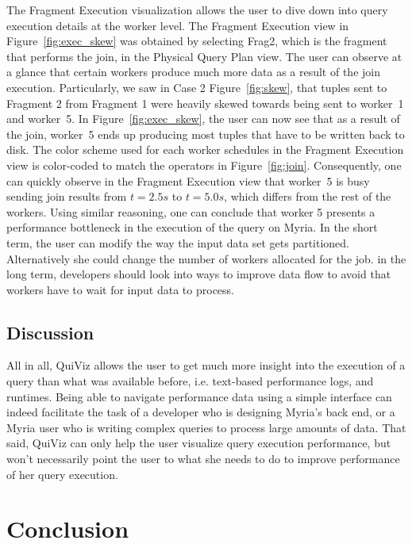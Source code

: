 \documentclass{chi2009}
\newcommand*{\system}{QuiViz\xspace}
\newcommand*{\graph}{Physical Query Plan\xspace}
\newcommand*{\fragment}{Fragment Execution\xspace}
\begin{document}
The \fragment visualization allows the user to dive down into query execution details at the worker level. The \fragment view in Figure~\ref{fig:exec_skew} was obtained by selecting Frag2, which is the fragment that performs the join, in the \graph view. The user can observe at a glance that certain workers produce much more data as a result of the join execution. Particularly, we saw in Case 2 Figure~\ref{fig:skew}, that tuples sent to Fragment 2 from Fragment 1 were heavily skewed towards being sent to worker~1 and worker~5. In Figure~\ref{fig:exec_skew}, the user can now see that as a result of the join, worker~5 ends up producing most tuples that have to be written back to disk. The color scheme used for each worker schedules in the \fragment view is color-coded to match the operators in Figure~\ref{fig:join}. Consequently, one can quickly observe in the \fragment view that worker~5 is busy sending join results from $t = 2.5s$ to $t = 5.0s$, which differs from the rest of the workers. Using similar reasoning, one can conclude that worker 5 presents a performance bottleneck in the execution of the query on Myria. In the short term, the user can modify the way the input data set gets partitioned. Alternatively she could change the number of workers allocated for the job. in the long term, developers should look into ways to improve data flow to avoid that workers have to wait for input data to process.

\subsection{Discussion}

All in all, \system allows the user to get much more insight into the execution of a query than what was available before, i.e. text-based performance logs, and runtimes. Being able to navigate performance data using a simple interface can indeed facilitate the task of a developer who is designing Myria's back end, or a Myria user who is writing complex queries to process large amounts of data. That said, \system can only help the user visualize query execution performance, but won't necessarily point the user to what she needs to do to improve performance of her query execution.


\section{Conclusion}
\end{document}
